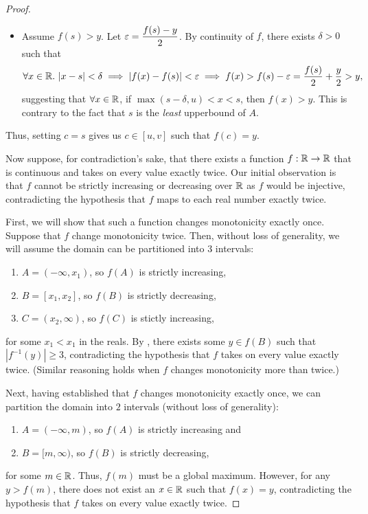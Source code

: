 \begin{problem}
\begin{proof}
\begin{subproof}
\begin{itemize}
        \item Assume $f(s) > y$. Let $\varepsilon = \dfrac{f(s) - y}{2}$. By continuity of $f$, there exists $\delta > 0$ 
          such that
          \[
            \forall x \in \mathbb{R}.\, \left\lvert x - s \right\rvert < \delta \implies \left\lvert f(x) - f(s) \right\rvert < \varepsilon \implies f(x) > f(s) - \varepsilon = \frac{f(s)}{2} + \frac{y}{2} > y,
          \]
          suggesting that $\forall x \in \mathbb{R}$, if $\max{(s - \delta, u)} < x < s$, then $f(x) > y$. This is contrary to the fact that
          $s$ is the \textit{least} upperbound of $A$.

      \end{itemize}

      Thus, setting $c = s$ gives us $c \in [u, v]$ such that $f(c) = y$.
    \end{subproof}

    Now suppose, for contradiction's sake, that there exists a function $f : \mathbb{R} \to \mathbb{R}$
    that is continuous and takes on every value exactly twice. Our initial
    observation is that $f$ cannot be strictly increasing or decreasing over 
    $\mathbb{R}$ as $f$ would be injective, contradicting the hypothesis that $f$ maps 
    to each real number exactly twice. 

    First, we will show that such a function changes monotonicity exactly once.
    Suppose that $f$ change monotonicity twice. Then, without loss of generality, we will
    assume the domain can be partitioned into $3$ intervals:
    \begin{enumerate}[label=(\roman*)]
      \item $A = (-\infty, x_{1})$, so $f(A)$ is strictly increasing,
      \item $B = [x_{1}, x_{2}]$, so $f(B)$ is strictly decreasing,
      \item $C = (x_{2}, \infty)$, so $f(C)$ is stictly increasing,
    \end{enumerate}
    for some $x_{1} < x_{1}$ in the reals.
    By , there exists some $y \in f(B)$
    such that $|f^{-1}(y)| \geq 3$, contradicting the hypothesis that $f$ takes
    on every value exactly twice. (Similar reasoning holds when $f$ changes
    monotonicity more than twice.)

    Next, having established that $f$ changes monotonicity exactly once,
    we can partition the domain into $2$ intervals (without loss of generality):
    \begin{enumerate}[label=(\roman*)]
      \item $A = (-\infty, m)$, so $f(A)$ is strictly increasing and
      \item $B = [m, \infty)$, so $f(B)$ is strictly decreasing,
    \end{enumerate}
    for some $m \in \mathbb{R}$.
    Thus, $f(m)$ must be a global maximum. However, for any $y > f(m)$, there
    does not exist an $x \in \mathbb{R}$ such that $f(x) = y$, contradicting the hypothesis that 
    $f$ takes on every value exactly twice.

  \end{proof}

\end{problem}


